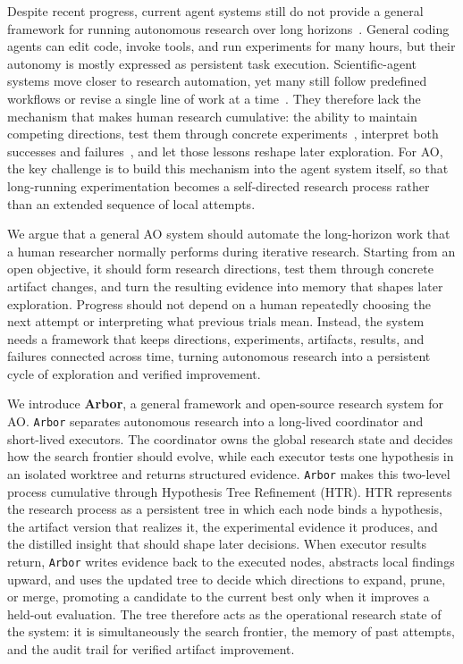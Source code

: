 \documentclass[]{selfevolagent}
\theoremstyle{plain}
\theoremstyle{definition}
\theoremstyle{remark}
\newcommand{\arbor}{\texttt{Arbor}}
\begin{document}
Despite recent progress, current agent systems still do not provide a general framework for running autonomous research over long horizons~\citep{metaharness,autoharness}. General coding agents can edit code, invoke tools, and run experiments for many hours, but their autonomy is mostly expressed as persistent task execution. Scientific-agent systems move closer to research automation, yet many still follow predefined workflows or revise a single line of work at a time~\citep{aiscientist,agentlaboratory,aflow}. They therefore lack the mechanism that makes human research cumulative: the ability to maintain competing directions, test them through concrete experiments~\citep{treeofthoughts,lats}, interpret both successes and failures~\citep{memorysurvey}, and let those lessons reshape later exploration. For AO, the key challenge is to build this mechanism into the agent system itself, so that long-running experimentation becomes a self-directed research process rather than an extended sequence of local attempts.

We argue that a general AO system should automate the long-horizon work that a human researcher normally performs during iterative research. Starting from an open objective, it should form research directions, test them through concrete artifact changes, and turn the resulting evidence into memory that shapes later exploration. Progress should not depend on a human repeatedly choosing the next attempt or interpreting what previous trials mean. Instead, the system needs a framework that keeps directions, experiments, artifacts, results, and failures connected across time, turning autonomous research into a persistent cycle of exploration and verified improvement.

We introduce \textbf{Arbor}, a general framework and open-source research system for AO. \arbor{} separates autonomous research into a long-lived coordinator and short-lived executors. The coordinator owns the global research state and decides how the search frontier should evolve, while each executor tests one hypothesis in an isolated worktree and returns structured evidence. \arbor{} makes this two-level process cumulative through Hypothesis Tree Refinement (HTR). HTR represents the research process as a persistent tree in which each node binds a hypothesis, the artifact version that realizes it, the experimental evidence it produces, and the distilled insight that should shape later decisions. When executor results return, \arbor{} writes evidence back to the executed nodes, abstracts local findings upward, and uses the updated tree to decide which directions to expand, prune, or merge, promoting a candidate to the current best only when it improves a held-out evaluation. The tree therefore acts as the operational research state of the system: it is simultaneously the search frontier, the memory of past attempts, and the audit trail for verified artifact improvement.
\end{document}
